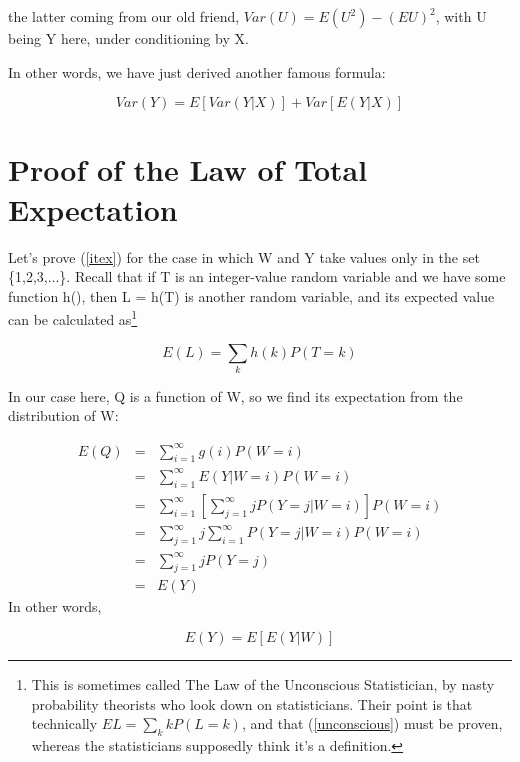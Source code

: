 the latter coming from our old friend, $Var(U) = E(U^2) - (EU)^2$, with
U being Y here, under conditioning by X.

In other words, we have just derived another famous formula:

\begin{equation}
Var(Y) = E[Var(Y|X)] + Var[E(Y|X)]
\end{equation}

\section{Proof of the Law of Total Expectation}
\label{proveitex} 

Let's prove (\ref{itex}) for the case in which W and Y take values only
in the set \{1,2,3,...\}.  Recall that if T is an integer-value random
variable and we have some function h(), then L = h(T) is another random
variable, and its expected value can be calculated as\footnote{This is
sometimes called The Law of the Unconscious Statistician, by nasty
probability theorists who look down on statisticians.  Their point is
that technically $EL = \sum_k k P(L = k)$, and that (\ref{unconscious})
must be proven, whereas the statisticians supposedly think it's a
definition.}  

\begin{equation}
\label{unconscious}
E(L) = \sum_k h(k) P(T = k)
\end{equation}

In our case here, Q is a function of W, so we find its expectation from
the distribution of W:

\begin{eqnarray*}
E(Q) & = & \sum ^{\infty }_{i=1}g(i) P(W=i)\\
 & = & \sum ^{\infty }_{i=1}E(Y|W=i)P(W=i)\\
 & = & \sum ^{\infty }_{i=1} \left [ \sum ^{\infty }_{j=1}jP(Y=j|W=i) \right ] P(W=i) \\
 & = & \sum ^{\infty }_{j=1}j\sum ^{\infty }_{i=1}P(Y=j|W=i)P(W=i)\\
 & = & \sum ^{\infty }_{j=1}jP(Y=j)\\
 & = & E(Y)
\end{eqnarray*}
 In other words, 

\begin{equation}
E(Y)=E[E(Y|W)]
\end{equation}

